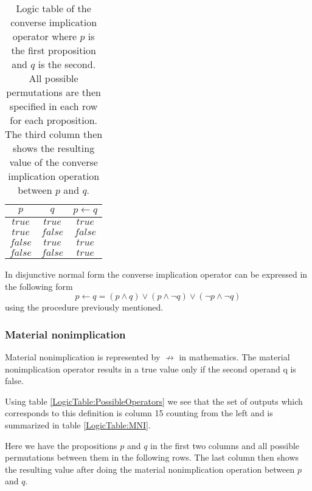                 \begin{table}[h!]
                    \centering
                    \begin{tabular}{|c|c|c|}
                        \hline
                        $p$   &   $q$   & $p \leftarrow q$ \\ \hline
                        $true$  & $true$  &      $true$       \\ \hline
                        $true$  & $false$ &      $false$      \\ \hline
                        $false$ & $true$  &      $true$       \\ \hline
                        $false$ & $false$ &      $true$       \\ \hline
                    \end{tabular}
                    \caption{Logic table of the converse implication operator where $p$ is the first proposition and $q$ is the second. All possible permutations are then specified in each row for each proposition. The third column then shows the resulting value of the converse implication operation between $p$ and $q$.}
                    \label{LogicTable:CI}
                \end{table}
            
                In disjunctive normal form the converse implication operator can be expressed in the following form
                \begin{equation}
                p \leftarrow q = (p \wedge  q) \vee (p \wedge \neg q) \vee (\neg p \wedge \neg q)
                \end{equation}
                using the procedure previously mentioned.
                
            \subsubsection{Material nonimplication}
                Material nonimplication is represented by $\not\rightarrow$ in mathematics. The material nonimplication operator results in a true value only if the second operand q is false.
                
                Using table \ref{LogicTable:PossibleOperators} we see that the set of outputs which corresponds to this definition is column 15 counting from the left and is summarized in table \ref{LogicTable:MNI}.
                
                Here we have the propositions $p$ and $q$ in the first two columns and all possible permutations between them in the following rows. The last column then shows the resulting value after doing the material nonimplication operation between $p$ and $q$.
                
